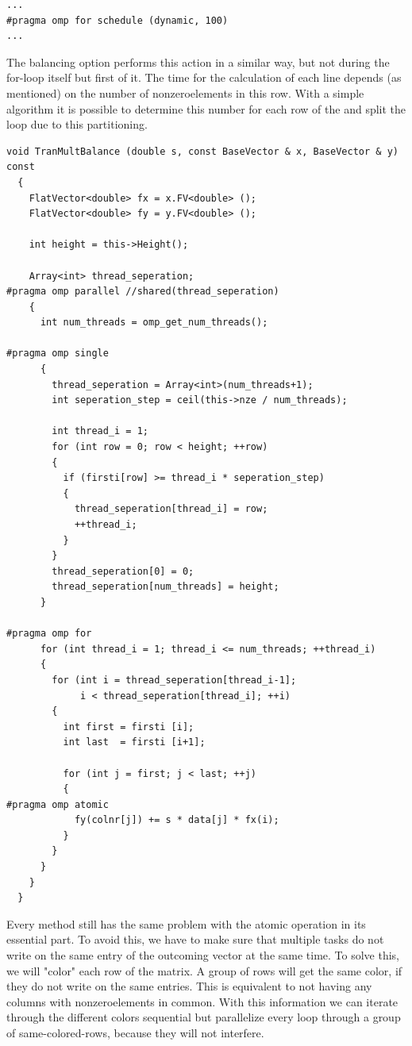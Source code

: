 \documentclass[a4paper,11pt]{scrartcl}
\begin{document}
\begin{lstlisting}
...
#pragma omp for schedule (dynamic, 100)
...
\end{lstlisting}

The balancing option performs this action in a similar way, but not during the
for-loop itself but first of it. The time for the calculation of each line
depends (as mentioned) on the number of nonzeroelements in this row. With a
simple algorithm it is possible to  determine this number for each row of the
 and split the loop due to this partitioning.

\begin{lstlisting}
void TranMultBalance (double s, const BaseVector & x, BaseVector & y) const
  {
    FlatVector<double> fx = x.FV<double> ();
    FlatVector<double> fy = y.FV<double> ();

    int height = this->Height();

    Array<int> thread_seperation;
#pragma omp parallel //shared(thread_seperation)
    {
      int num_threads = omp_get_num_threads();

#pragma omp single
      {
        thread_seperation = Array<int>(num_threads+1);
        int seperation_step = ceil(this->nze / num_threads);

        int thread_i = 1;
        for (int row = 0; row < height; ++row)
        {
          if (firsti[row] >= thread_i * seperation_step)
          {
            thread_seperation[thread_i] = row;
            ++thread_i;
          }
        }
        thread_seperation[0] = 0;
        thread_seperation[num_threads] = height;
      }

#pragma omp for
      for (int thread_i = 1; thread_i <= num_threads; ++thread_i)
      {
        for (int i = thread_seperation[thread_i-1];
             i < thread_seperation[thread_i]; ++i)
        {
          int first = firsti [i];
          int last  = firsti [i+1];

          for (int j = first; j < last; ++j)
          {
#pragma omp atomic
            fy(colnr[j]) += s * data[j] * fx(i);
          }
        }
      }
    }
  }

\end{lstlisting}

Every method still has the same problem with the atomic operation in its
essential part. To avoid this, we have to make sure that multiple tasks do not
write on the same entry of the outcoming vector at the same time. To solve this,
 we will "color" each row of the matrix. A group of rows will get the same
color, if they do not write on the same entries. This is equivalent to not having
any columns with nonzeroelements in common. With this information we can iterate through the different colors sequential but parallelize every loop through
 a group of same-colored-rows, because they will not interfere.
\end{document}
